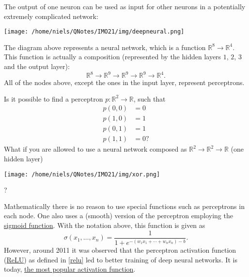 The output of one neuron can be used as input for other neurons in a potentially extremely complicated network:

\begin{center}\texttt{[image: /home/niels/QNotes/IMO21/img/deepneural.png]}\end{center}

The diagram above represents a neural network, which is a function $\mathbb{R}^8\rightarrow \mathbb{R}^4$. This function
is actually a composition (represented by the hidden layers $1$, $2$, $3$ and the output layer):
$$
  \mathbb{R}^8\rightarrow \mathbb{R}^9 \rightarrow \mathbb{R}^9 \rightarrow \mathbb{R}^9 \rightarrow \mathbb{R}^4.
$$
All of the nodes above, except the ones in the input layer, represent perceptrons.

\begin{exercise}
  Is it possible to find a perceptron $p:\mathbb{R}^2\rightarrow \mathbb{R}$, such that
  \begin{align*}
    p(0,0)  & = 0  \\
    p(1, 0) & = 1  \\
    p(0,1)  & = 1  \\
    p(1, 1) & = 0?
  \end{align*}
  What if you are allowed to use a neural network composed as $\mathbb{R}^2\rightarrow \mathbb{R}^2\rightarrow \mathbb{R}$ (one hidden layer)
  \begin{center}\texttt{[image: /home/niels/QNotes/IMO21/img/xor.png]}\end{center}?
\end{exercise}

Mathematically there is no reason to use special functions such as perceptrons in each node. One also uses
a (smooth) version of the perceptron employing the \href{https://en.wikipedia.org/wiki/Sigmoid\_function}{sigmoid function}.
With the notation above, this function is given as
$$
  \sigma(x_1, \dots, x_n) = \frac{1}{1 + e^{-(w_1 x_1 + \cdots + w_n x_n) - b}}.
$$
However, around 2011 it was observed that the perceptron activation function (\href{https://en.wikipedia.org/wiki/Rectifier\_(neural\_networks)}{ReLU}) as defined in \eqref{relu} led to better training
of deep neural networks. It is today, \href{https://towardsdatascience.com/understanding-relu-the-most-popular-activation-function-in-5-minutes-459e3a2124f}{the most popular activation function}.



